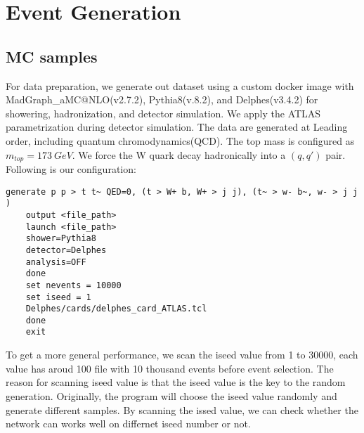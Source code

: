 \chapter{Event Generation}\label{Event Generation}



\section{MC samples}\label{sec:MC sample}
For data preparation, we generate out dataset using a custom docker image with MadGraph\_aMC@NLO(v2.7.2), Pythia8(v.8.2), and Delphes(v3.4.2) for showering, hadronization, and detector simulation. We apply the ATLAS parametrization during detector simulation.  The data are generated at Leading order, including quantum chromodynamics(QCD). The top mass is configured as $m_{top}=173\ GeV$. We force the W quark decay hadronically into a $(q, q')$ pair. Following is our configuration:
\\

\begin{adjustbox}{max width=\textwidth}
\centering
\begin{lstlisting}[caption={Configuration for generating samples},captionpos=b]
	generate p p > t t~ QED=0, (t > W+ b, W+ > j j), (t~ > w- b~, w- > j j ) 
	output <file_path> 
	launch <file_path> 
	shower=Pythia8  
	detector=Delphes 
	analysis=OFF 
	done  
	set nevents = 10000 
	set iseed = 1 
	Delphes/cards/delphes_card_ATLAS.tcl
	done 
	exit 
\end{lstlisting}
\end{adjustbox}

To get a more general performance, we scan the iseed value from 1 to 30000, each value has aroud 100 file with 10 thousand events before event selection. The reason for scanning iseed value is that the iseed value is the key to the random generation. Originally, the program will choose the iseed value randomly and generate different samples. By scanning the issed value, we can check whether the network can works well on differnet iseed number or not.




